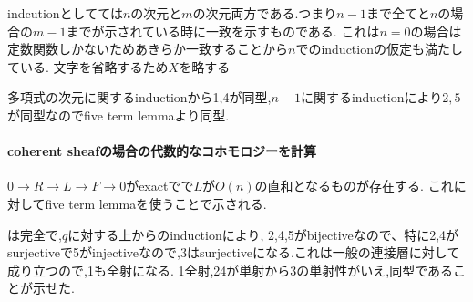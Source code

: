 indcutionとしてては$n$の次元と$m$の次元両方である.つまり$n-1$まで全てと$n$の場合の$m-1$までが示されている時に一致を示すものである.
これは$n=0$の場合は定数関数しかないためあきらか一致することから$n$でのinductionの仮定も満たしている.
文字を省略するため$X$を略する

多項式の次元に関するinductionから1,4が同型,$n-1$に関するinductionにより$2,5$が同型なのでfive term lemmaより同型.

\paragraph{coherent sheafの場合の代数的なコホモロジーを計算}
$0 \to R \to L  \to F \to 0$がexactでで$L$が$O(n)$の直和となるものが存在する.
これに対してfive term lemmaを使うことで示される.



は完全で,$q$に対する上からのinductionにより,
2,4,5がbijectiveなので、特に2,4がsurjectiveで5がinjectiveなので,3はsurjectiveになる.これは一般の連接層に対して成り立つので,1も全射になる.
1全射,24が単射から3の単射性がいえ,同型であることが示せた.